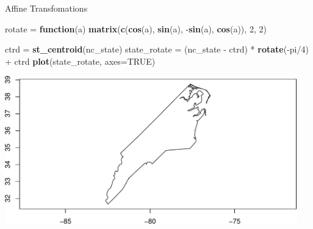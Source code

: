 \documentclass[11pt,ignorenonframetext,]{beamer}
\newenvironment{Shaded}{}{}
\newcommand{\KeywordTok}[1]{\textcolor[rgb]{0.00,0.44,0.13}{\textbf{#1}}}
\newcommand{\DataTypeTok}[1]{\textcolor[rgb]{0.56,0.13,0.00}{#1}}
\newcommand{\DecValTok}[1]{\textcolor[rgb]{0.25,0.63,0.44}{#1}}
\newcommand{\StringTok}[1]{\textcolor[rgb]{0.25,0.44,0.63}{#1}}
\newcommand{\OtherTok}[1]{\textcolor[rgb]{0.00,0.44,0.13}{#1}}
\newcommand{\ControlFlowTok}[1]{\textcolor[rgb]{0.00,0.44,0.13}{\textbf{#1}}}
\newcommand{\OperatorTok}[1]{\textcolor[rgb]{0.40,0.40,0.40}{#1}}
\newcommand{\NormalTok}[1]{#1}
\let\oldShaded\Shaded
\let\endoldShaded\endShaded
\renewenvironment{Shaded}{\footnotesize\begin{spacing}{0.9}\oldShaded}{\endoldShaded\end{spacing}}
\let\oldverbatim\verbatim
\let\endoldverbatim\endverbatim
\newcommand{\scriptoutput}{
  \renewenvironment{Shaded}{\scriptsize\begin{spacing}{0.9}\oldShaded}{\endoldShaded\end{spacing}}
  \renewenvironment{verbatim}{\scriptsize\begin{spacing}{0.9}\oldverbatim}{\endoldverbatim\end{spacing}}
}
\begin{document}
\begin{frame}[fragile,t]{Affine Transfomations}

\scriptoutput

\begin{Shaded}
\begin{Highlighting}[]
\NormalTok{rotate =}\StringTok{ }\ControlFlowTok{function}\NormalTok{(a) }\KeywordTok{matrix}\NormalTok{(}\KeywordTok{c}\NormalTok{(}\KeywordTok{cos}\NormalTok{(a), }\KeywordTok{sin}\NormalTok{(a), }\OperatorTok{-}\KeywordTok{sin}\NormalTok{(a), }\KeywordTok{cos}\NormalTok{(a)), }\DecValTok{2}\NormalTok{, }\DecValTok{2}\NormalTok{)}

\NormalTok{ctrd =}\StringTok{ }\KeywordTok{st_centroid}\NormalTok{(nc_state)}
\NormalTok{state_rotate =}\StringTok{ }\NormalTok{(nc_state }\OperatorTok{-}\StringTok{ }\NormalTok{ctrd) }\OperatorTok{*}\StringTok{ }\KeywordTok{rotate}\NormalTok{(}\OperatorTok{-}\NormalTok{pi}\OperatorTok{/}\DecValTok{4}\NormalTok{) }\OperatorTok{+}\StringTok{ }\NormalTok{ctrd}
\KeywordTok{plot}\NormalTok{(state_rotate, }\DataTypeTok{axes=}\OtherTok{TRUE}\NormalTok{)}
\end{Highlighting}
\end{Shaded}

\begin{center}\includegraphics[width=0.95\textwidth]{Lec17_files/figure-beamer/unnamed-chunk-24-1} \end{center}

\end{frame}
\end{document}
